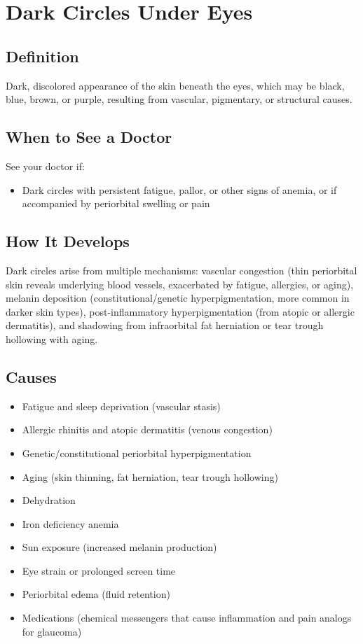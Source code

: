 \chapter{Dark Circles Under Eyes}

\section*{Definition}
Dark, discolored appearance of the skin beneath the eyes, which may be black, blue, brown, or purple, resulting from vascular, pigmentary, or structural causes.

\section*{When to See a Doctor}
See your doctor if:
\begin{itemize}
  \item Dark circles with persistent fatigue, pallor, or other signs of anemia, or if accompanied by periorbital swelling or pain
\end{itemize}

\section*{How It Develops}
Dark circles arise from multiple mechanisms: vascular congestion (thin periorbital skin reveals underlying blood vessels, exacerbated by fatigue, allergies, or aging), melanin deposition (constitutional/genetic hyperpigmentation, more common in darker skin types), post-inflammatory hyperpigmentation (from atopic or allergic dermatitis), and shadowing from infraorbital fat herniation or tear trough hollowing with aging.

\section*{Causes}
\begin{itemize}
  \item Fatigue and sleep deprivation (vascular stasis)
  \item Allergic rhinitis and atopic dermatitis (venous congestion)
  \item Genetic/constitutional periorbital hyperpigmentation
  \item Aging (skin thinning, fat herniation, tear trough hollowing)
  \item Dehydration
  \item Iron deficiency anemia
  \item Sun exposure (increased melanin production)
  \item Eye strain or prolonged screen time
  \item Periorbital edema (fluid retention)
  \item Medications (chemical messengers that cause inflammation and pain analogs for glaucoma)
\end{itemize}

